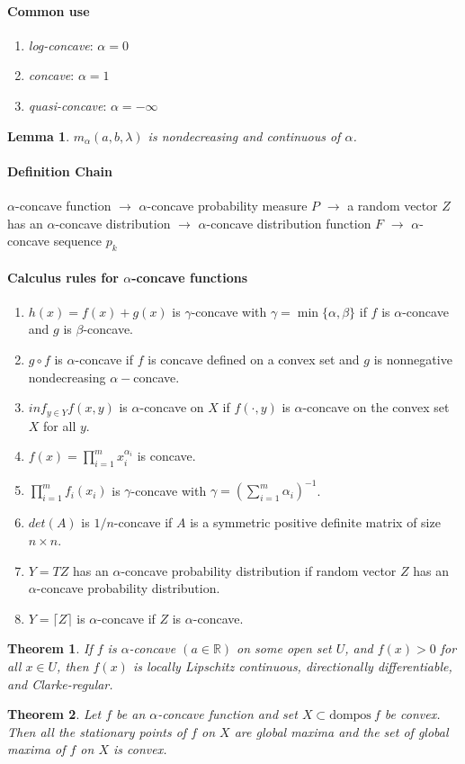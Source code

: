 \documentclass[a4pper,11pt]{article}
\newtheorem{thm}{Theorem}[section]
\newtheorem{lemma}{Lemma}[section]
\begin{document}
\paragraph{Common use}
\begin{enumerate}
\item \textit{log-concave}: $\alpha=0$
\item \textit{concave}: $\alpha=1$
\item \textit{quasi-concave}: $\alpha=-\infty$
\end{enumerate}

\begin{lemma}
$m_\alpha(a,b,\lambda)$ is nondecreasing and continuous of $\alpha$.
\end{lemma}

\paragraph{Definition Chain} $\alpha$-concave function $\to$ $\alpha$-concave probability measure $P$ $\to$ a random vector $Z$ has an $\alpha$-concave distribution $\to$ $\alpha$-concave distribution function $F$ $\to$ $\alpha$-concave sequence $p_k$

\paragraph{Calculus rules for $\alpha$-concave functions}
\begin{enumerate}
\item $h(x)=f(x)+g(x)$ is $\gamma$-concave with $\gamma=\min\{\alpha,\beta\}$ if $f$ is $\alpha$-concave and $g$ is $\beta$-concave.
\item $g\circ f$ is $\alpha$-concave if $f$ is concave defined on a convex set and $g$ is nonnegative nondecreasing $\alpha-$concave.
\item $inf_{y\in Y}f(x,y)$ is $\alpha$-concave on $X$ if $f(\cdot,y)$ is $\alpha$-concave on the convex set $X$ for all $y$.
\item $f(x)=\prod_{i=1}^m x_i^{\alpha_i}$ is concave.
\item $\prod_{i=1}^m f_i(x_i)$ is $\gamma$-concave with $\gamma=(\sum_{i=1}^m\alpha_i)^{-1}$.
\item $det(A)$ is $1/n$-concave if $A$ is a symmetric positive deﬁnite matrix of size $n\times n$.
\item $Y=TZ$ has an $\alpha$-concave probability distribution if random vector $Z$ has an $\alpha$-concave probability distribution.
\item $Y=\lceil Z\rceil$ is $\alpha$-concave if $Z$ is $\alpha$-concave.
\end{enumerate}
\begin{thm}
If $f$ is $\alpha$-concave $(a\in \mathbb R)$ on some open set $U$, and $f(x)>0$ for all $x\in U$, then $f(x)$ is locally Lipschitz continuous, directionally differentiable, and Clarke-regular.
\end{thm}
\begin{thm}
Let $f$ be an $\alpha$-concave function and set $X\subset \text{dompos} \ f$ be convex. Then all the stationary points of $f$ on $X$ are global maxima and the set of global maxima of $f$ on $X$ is convex.
\end{thm}
\end{document}
